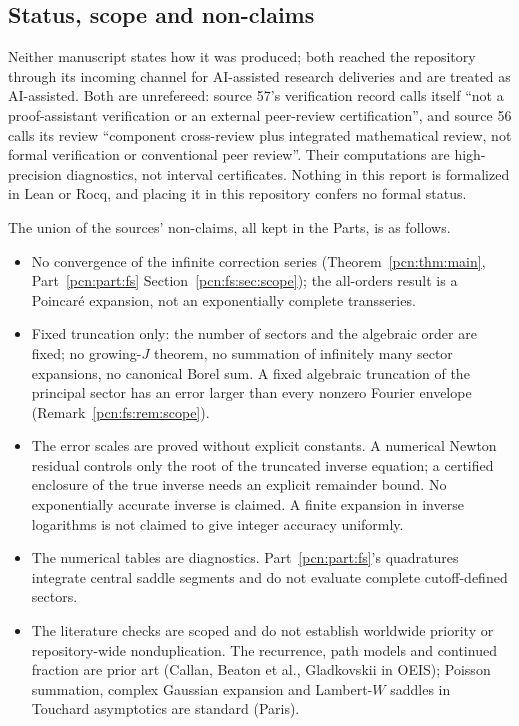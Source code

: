 \documentclass[11pt,letterpaper]{article}
\theoremstyle{remark}\newtheorem{remark}[theorem]{Remark}
\begin{document}
\subsection*{Status, scope and non-claims}
\label{pcn:guide:status}
Neither manuscript states how it was produced; both reached the repository through its incoming channel for AI-assisted research deliveries and are treated as AI-assisted. Both are unrefereed: source 57's verification record calls itself ``not a proof-assistant verification or an external peer-review certification'', and source 56 calls its review ``component cross-review plus integrated mathematical review, not formal verification or conventional peer review''. Their computations are high-precision diagnostics, not interval certificates. Nothing in this report is formalized in Lean or Rocq, and placing it in this repository confers no formal status.

The union of the sources' non-claims, all kept in the Parts, is as follows.
\begin{itemize}
\item No convergence of the infinite correction series (Theorem~\ref{pcn:thm:main}, Part~\ref{pcn:part:fs} Section~\ref{pcn:fs:sec:scope}); the all-orders result is a Poincar\'e expansion, not an exponentially complete transseries.
\item Fixed truncation only: the number of sectors and the algebraic order are fixed; no growing-$J$ theorem, no summation of infinitely many sector expansions, no canonical Borel sum. A fixed algebraic truncation of the principal sector has an error larger than every nonzero Fourier envelope (Remark~\ref{pcn:fs:rem:scope}).
\item The error scales are proved without explicit constants. A numerical Newton residual controls only the root of the truncated inverse equation; a certified enclosure of the true inverse needs an explicit remainder bound. No exponentially accurate inverse is claimed. A finite expansion in inverse logarithms is not claimed to give integer accuracy uniformly.
\item The numerical tables are diagnostics. Part~\ref{pcn:part:fs}'s quadratures integrate central saddle segments and do not evaluate complete cutoff-defined sectors.
\item The literature checks are scoped and do not establish worldwide priority or repository-wide nonduplication. The recurrence, path models and continued fraction are prior art (Callan, Beaton et al., Gladkovskii in OEIS); Poisson summation, complex Gaussian expansion and Lambert-$W$ saddles in Touchard asymptotics are standard (Paris).
\end{itemize}
\end{document}
